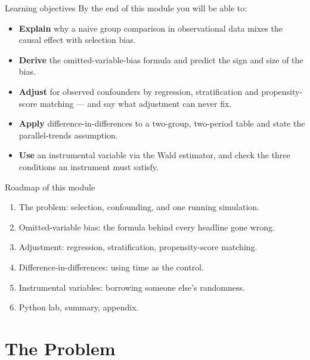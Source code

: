 \documentclass[aspectratio=169,11pt]{beamer}
\begin{document}
\begin{frame}{Learning objectives}
  By the end of this module you will be able to:
  \begin{itemize}
    \item \textbf{Explain} why a naive group comparison in observational data mixes
          the causal effect with selection bias.
    \item \textbf{Derive} the omitted-variable-bias formula and predict the sign and
          size of the bias.
    \item \textbf{Adjust} for observed confounders by regression, stratification and
          propensity-score matching --- and say what adjustment can never fix.
    \item \textbf{Apply} difference-in-differences to a two-group, two-period table
          and state the parallel-trends assumption.
    \item \textbf{Use} an instrumental variable via the Wald estimator, and check the
          three conditions an instrument must satisfy.
  \end{itemize}
\end{frame}

\begin{frame}{Roadmap of this module}
  \begin{takeaway}
    \begin{enumerate}
      \item The problem: selection, confounding, and one running simulation.
      \item Omitted-variable bias: the formula behind every headline gone wrong.
      \item Adjustment: regression, stratification, propensity-score matching.
      \item Difference-in-differences: using time as the control.
      \item Instrumental variables: borrowing someone else's randomness.
      \item Python lab, summary, appendix.
    \end{enumerate}
  \end{takeaway}
\end{frame}

\section{The Problem}
\end{document}
